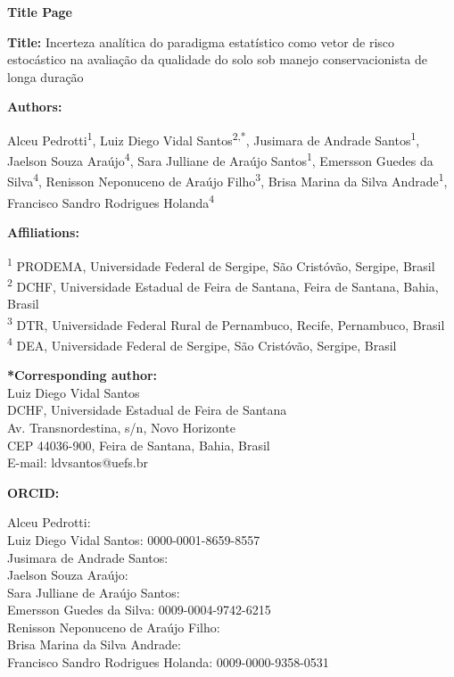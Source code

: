 \documentclass[12pt,a4paper]{article}
\begin{document}
\begin{center}
{\Large\bfseries Title Page}
\end{center}

\bigskip

\noindent\textbf{Title:} Incerteza analítica do paradigma estatístico como vetor de risco estocástico na avaliação da qualidade do solo sob manejo conservacionista de longa duração

\bigskip

\noindent\textbf{Authors:}

\medskip

\noindent
Alceu Pedrotti\textsuperscript{1},
Luiz Diego Vidal Santos\textsuperscript{2,*},
Jusimara de Andrade Santos\textsuperscript{1},
Jaelson Souza Araújo\textsuperscript{4},
Sara Julliane de Araújo Santos\textsuperscript{1},
Emersson Guedes da Silva\textsuperscript{4},
Renisson Neponuceno de Araújo Filho\textsuperscript{3},
Brisa Marina da Silva Andrade\textsuperscript{1},
Francisco Sandro Rodrigues Holanda\textsuperscript{4}

\bigskip

\noindent\textbf{Affiliations:}

\medskip

\noindent
\textsuperscript{1} PRODEMA, Universidade Federal de Sergipe, São Cristóvão, Sergipe, Brasil\\[3pt]
\textsuperscript{2} DCHF, Universidade Estadual de Feira de Santana, Feira de Santana, Bahia, Brasil\\[3pt]
\textsuperscript{3} DTR, Universidade Federal Rural de Pernambuco, Recife, Pernambuco, Brasil\\[3pt]
\textsuperscript{4} DEA, Universidade Federal de Sergipe, São Cristóvão, Sergipe, Brasil

\bigskip

\noindent\textbf{*Corresponding author:}\\
Luiz Diego Vidal Santos\\
DCHF, Universidade Estadual de Feira de Santana\\
Av. Transnordestina, s/n, Novo Horizonte\\
CEP 44036-900, Feira de Santana, Bahia, Brasil\\
E-mail: ldvsantos@uefs.br

\bigskip

\noindent\textbf{ORCID:}

\medskip

\noindent
Alceu Pedrotti: \\
Luiz Diego Vidal Santos: 0000-0001-8659-8557\\
Jusimara de Andrade Santos: \\
Jaelson Souza Araújo: \\
Sara Julliane de Araújo Santos: \\
Emersson Guedes da Silva: 0009-0004-9742-6215\\
Renisson Neponuceno de Araújo Filho: \\
Brisa Marina da Silva Andrade: \\
Francisco Sandro Rodrigues Holanda: 0009-0000-9358-0531
\end{document}
